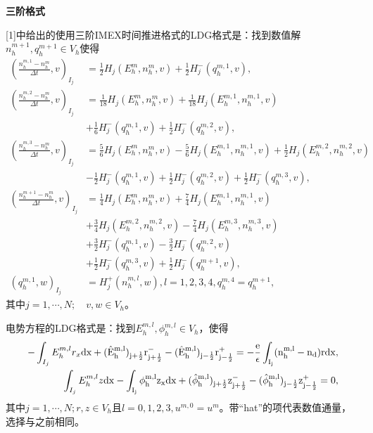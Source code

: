 \noindent \textbf{三阶格式}

[1]中给出的使用三阶IMEX时间推进格式的LDG格式是：找到数值解$n_h^{m+1},q_h^{m+1} \in V_h$使得
\begin{align}
    (\frac{n_h^{m,1} -n_h^m}{\Delta t},v)_{I_j} & =\frac{1}{2} H_j(E_h^m,n_h^m,v) + \frac{1}{2} H_j^-(q_h^{m,1},v),           \label{weakForm:IMEX3 LDG 1:translation}       \\
    (\frac{n_h^{m,2} -n_h^m}{\Delta t},v)_{I_j} & = \frac{1}{18} H_j(E_h^m,n_h^m,v) + \frac{1}{18} H_j(E_h^{m,1},n_h^{m,1},v) \nonumber                                      \\
                                                & + \frac{1}{6} H_j^-(q_h^{m,1},v) + \frac{1}{2} H_j^-(q_h^{m,2},v),                                                         \\
    (\frac{n_h^{m,3} -n_h^m}{\Delta t},v)_{I_j} & =\frac{5}{6} H_j(E_h^m,n_h^m,v) -\frac{5}{6} H_j(E_h^{m,1},n_h^{m,1},v) + \frac{1}{2} H_j(E_h^{m,2},n_h^{m,2},v) \nonumber \\
                                                & - \frac{1}{2} H_j^-(q_h^{m,1},v) + \frac{1}{2} H_j^-(q_h^{m,2},v) + \frac{1}{2} H_j^-(q_h^{m,3},v),                        \\
    (\frac{n_h^{m+1} -n_h^m}{\Delta t},v)_{I_j} & = \frac{1}{4} H_j(E_h^m,n_h^m,v) +\frac{7}{4} H_j(E_h^{m,1},n_h^{m,1},v)  \nonumber                                        \\
                                                & + \frac{3}{4} H_j(E_h^{m,2},n_h^{m,2},v) - \frac{7}{4} H_j(E_h^{m,3},n_h^{m,3},v) \nonumber                                \\
                                                & +\frac{3}{2} H_j^-(q_h^{m,1},v) -\frac{3}{2} H_j^-(q_h^{m,2},v) \nonumber                                                  \\
                                                & + \frac{1}{2} H_j^-(q_h^{m,3},v)  + \frac{1}{2} H_j^-(q_h^{m+1},v),                                                        \\
    (q_h^{m,1},w)_{I_j}                         & = H_j^+(n_h^{m,l},w), l = 1,2,3,4, q_h^{m,4} = q_h^{m+1},
\end{align}
其中$j = 1,\cdots,N;\quad v,w \in V_h$。

电势方程的LDG格式是：找到$E_h^{m,l},\phi_h^{m,l} \in V_h$，使得
\begin{align}
    -\int_{I_j} E_h^{m,l}r_x \rm{d}x + (\hat{E}_h^{m,l})_{j+\frac{1}{2}}r_{j+\frac{1}{2}}^- - (\hat{E}_h^{m,l})_{j-\frac{1}{2}}r_{j-\frac{1}{2}}^+ = -\frac{e}{\epsilon}\int_{I_j}(n_h^{m,l} - n_d) r\rm{d} x, \\
    \int_{I_j} E_h^{m,l}z \rm{d}x - \int_{I_j} \phi_h^{m,l}z_x \rm{d}x  + (\hat{\phi}_h^{m,l})_{j+\frac{1}{2}}z^-_{j+\frac{1}{2}} - (\hat{\phi}_h^{m,l})_{j-\frac{1}{2}}z_{j-\frac{1}{2}}^+  = 0,\label{equation:IMEX3 LDG:EPE 2:translation}
\end{align}
其中$j = 1,\cdots,N; r,z \in V_h$且$l = 0,1,2,3, u^{m,0} = u^m$。带“hat”的项代表数值通量，选择与之前相同。
